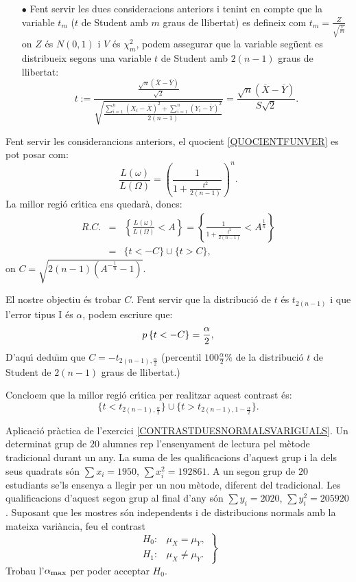 {\begin{itemize}
sabem que la suma de dues variables
independents amb distribucions $\chi^2_{n_1}$ i $\chi^2_{n_2}$ es 
distribueix segons una distribuci\'o $\chi^2_{n_1 +n_2}$.
\item[$\bullet$]
Fent servir les dues consideracions anteriors i tenint en compte 
que la variable $t_m$ ($t$ de Student amb $m$ graus de llibertat)
es defineix com $t_m =\frac{Z}{\sqrt{\frac{V}{m}}}$ on $Z$ \'es $N(0,1)$ i
$V$ \'es $\chi^2_m$, podem assegurar que la variable seg\"uent es distribueix
segons una variable $t$ de Student amb $2(n-1)$ graus de llibertat:
\[
t:= \frac{
\frac{
\sqrt{n}(\overline{X}-\overline{Y})}{\sqrt{2}}}
{\sqrt{
\frac{\sum\limits_{i=1}^n {(X_i -\overline{X})}^2 +
\sum\limits_{i=1}^n {(Y_i -\overline{Y})}^2}{2 (n-1)}}} 
= \frac{\sqrt{n} (\overline{X}-\overline{Y})}{S \sqrt{2}}.
\]
\end{itemize}
Fent servir les considerancions anteriors,
el quocient \ref{QUOCIENTFUNVER} es pot posar com: 
\[
\frac{L(\omega)}{L(\Omega)}=
{\left(
\frac{1}{1+\frac{t^2}{2(n-1)}}\right)}^n.
\]
La millor regi\'o cr\'{\i}tica ens quedar\`a, doncs:
\begin{eqnarray*}
R.C. & = & \left\{\frac{L(\omega)}{L(\Omega)} < A\right\} =
\left\{
\frac{1}{1+\frac{t^2}{2(n-1)}}< A^{\frac{1}{n}}\right\} \\
& = & 
\{ t < -C\}\cup \{t> C\},
\end{eqnarray*}
on $C=\sqrt{2 (n-1) \left(A^{-\frac{1}{n}} -1\right)}$.

El nostre objectiu \'es trobar $C$. Fent servir que la 
distribuci\'o de $t$ \'es $t_{2(n-1)}$ i que l'error tipus I 
\'es $\alpha$, podem escriure que:
\[
p\left\{t< -C\right\}=\frac{\alpha}{2},
\]
D'aqu\'{\i} dedu\"{\i}m que $C=- t_{2(n-1),\frac{\alpha}{2}}$ (percentil 
$100\frac{\alpha}{2}\%$ de la distribuci\'o $t$ de Student de 
$2(n-1)$ graus de llibertat.)

Concloem que la millor regi\'o cr\'{\i}tica per realitzar aquest 
contrast \'es:
\[
\{ t < t_{2(n-1),\frac{\alpha}{2}}\}\cup \{t> t_{2(n-1),1-\frac{\alpha}{2}}\}.
\]
}

\begin{probres}
{Aplicaci\'o pr\`actica de l'exercici \ref{CONTRASTDUESNORMALSVARIGUALS}. 
Un determinat grup
de $20$ alumnes rep l'ensenyament de lectura 
pel m\`etode tradicional durant un
any. La suma de les qualificacions d'aquest grup i la dels seus quadrats 
s\'on $\sum x_i =1950$, $\sum x_i^2 =192861$. A un segon grup de $20$ estudiants
se'ls ensenya a llegir per un nou m\`etode, diferent del tradicional. Les
qualificacions d'aquest segon grup al final d'any s\'on $\sum y_i =2020$, $\sum
y_i^2 =205920$. Suposant que les mostres s\'on independents i de distribucions
normals amb la mateixa vari\`ancia, feu el contrast
$$\left.
\begin{array}{ll}
H_0 :& \mu_X=\mu_Y,\\ H_1 :& \mu_X\not
=\mu_Y.
\end{array}
\right\}$$
Trobau l'$\alpha_{\mbox{\footnotesize max}}$ per poder acceptar $H_0$.}
\end{probres}

